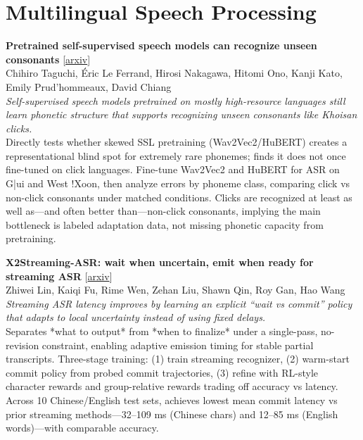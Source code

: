 \documentclass[12pt,letterpaper]{article}
\begin{document}
\medskip


\section*{Multilingual Speech Processing}

{\small\textbf{Pretrained self-supervised speech models can recognize unseen consonants}} {\scriptsize[\href{https://arxiv.org/abs/2606.11542}{arxiv}]}\\
{\scriptsize Chihiro Taguchi, \'Eric Le Ferrand, Hirosi Nakagawa, Hitomi Ono, Kanji Kato, Emily Prud'hommeaux, David Chiang}\\

{\small\textit{Self-supervised speech models pretrained on mostly high-resource languages still learn phonetic structure that supports recognizing unseen consonants like Khoisan clicks.}}\\[1pt]
{\footnotesize Directly tests whether skewed SSL pretraining (Wav2Vec2/HuBERT) creates a representational blind spot for extremely rare phonemes; finds it does not once fine-tuned on click languages. Fine-tune Wav2Vec2 and HuBERT for ASR on G|ui and West !Xoon, then analyze errors by phoneme class, comparing click vs non-click consonants under matched conditions. Clicks are recognized at least as well as---and often better than---non-click consonants, implying the main bottleneck is labeled adaptation data, not missing phonetic capacity from pretraining.}

\medskip

{\small\textbf{X2Streaming-ASR: wait when uncertain, emit when ready for streaming ASR}} {\scriptsize[\href{https://arxiv.org/abs/2609.08672}{arxiv}]}\\
{\scriptsize Zhiwei Lin, Kaiqi Fu, Rime Wen, Zehan Liu, Shawn Qin, Roy Gan, Hao Wang}\\

{\small\textit{Streaming ASR latency improves by learning an explicit ``wait vs commit'' policy that adapts to local uncertainty instead of using fixed delays.}}\\[1pt]
{\footnotesize Separates *what to output* from *when to finalize* under a single-pass, no-revision constraint, enabling adaptive emission timing for stable partial transcripts. Three-stage training: (1) train streaming recognizer, (2) warm-start commit policy from probed commit trajectories, (3) refine with RL-style character rewards and group-relative rewards trading off accuracy vs latency. Across 10 Chinese/English test sets, achieves lowest mean commit latency vs prior streaming methods---32--109 ms (Chinese chars) and 12--85 ms (English words)---with comparable accuracy.}
\end{document}
